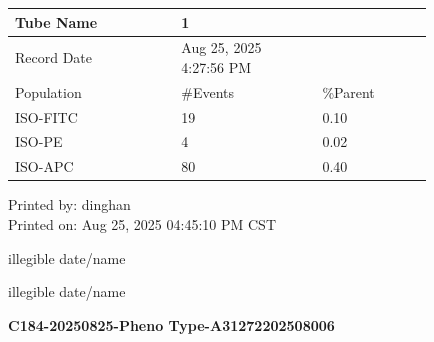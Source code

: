 \documentclass[UTF8,10pt,a4paper,fontset=fandol]{ctexart}
\newcommand{\fieldvalue}[1]{#1}
\newcommand{\handwritten}[1]{#1}
\begin{document}
\begin{center}
\small
\begin{tabular}{|p{0.33\linewidth}|p{0.28\linewidth}|p{0.22\linewidth}|}
\hline
Tube Name &
\fieldvalue{1} & \\
\hline
Record Date &
\fieldvalue{Aug 25, 2025 4:27:56 PM} & \\
\hline
Population & \#Events & \%Parent\\
\hline
ISO-FITC &
\fieldvalue{19} &
\fieldvalue{0.10}\\
\hline
ISO-PE &
\fieldvalue{4} &
\fieldvalue{0.02}\\
\hline
ISO-APC &
\fieldvalue{80} &
\fieldvalue{0.40}\\
\hline
\end{tabular}
\end{center}

\begin{flushright}
Printed by: dinghan\\
Printed on: Aug 25, 2025 04:45:10 PM CST

\handwritten{illegible date/name}

\handwritten{illegible date/name}
\end{flushright}

\newpage

\begin{center}
\textbf{C184-20250825-Pheno Type-A31272202508006}
\end{center}
\end{document}
